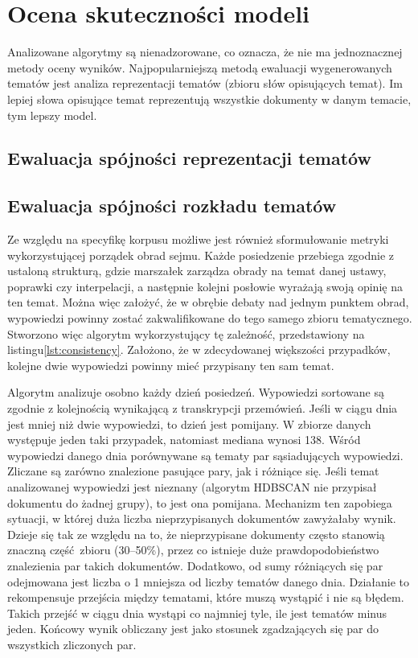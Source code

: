 
\chapter{Ocena skuteczności modeli}
	Analizowane algorytmy są nienadzorowane, co oznacza, że nie ma jednoznacznej metody oceny wyników.
	Najpopularniejszą metodą ewaluacji wygenerowanych tematów jest analiza reprezentacji tematów (zbioru słów opisujących temat).
	Im lepiej słowa opisujące temat reprezentują wszystkie dokumenty w danym temacie, tym lepszy model.

\section{Ewaluacja spójności reprezentacji tematów}


\section{Ewaluacja spójności rozkładu tematów}
	Ze względu na specyfikę korpusu możliwe jest również sformułowanie metryki wykorzystującej porządek obrad sejmu.
	Każde posiedzenie przebiega zgodnie z ustaloną strukturą, gdzie marszałek zarządza obrady na temat danej ustawy, poprawki czy interpelacji,
		a następnie kolejni posłowie wyrażają swoją opinię na ten temat.
	Można więc założyć, że w obrębie debaty nad jednym punktem obrad, wypowiedzi powinny zostać zakwalifikowane do tego samego zbioru tematycznego.
	Stworzono więc algorytm wykorzystujący tę zależność, przedstawiony na listingu\ref{lst:consistency}.
	Założono, że w zdecydowanej większości przypadków, kolejne dwie wypowiedzi powinny mieć przypisany ten sam temat.

	Algorytm analizuje osobno każdy dzień posiedzeń.
	Wypowiedzi sortowane są zgodnie z kolejnością wynikającą z transkrypcji przemówień.
	Jeśli w ciągu dnia jest mniej niż dwie wypowiedzi, to dzień jest pomijany.
	W zbiorze danych występuje jeden taki przypadek, natomiast mediana wynosi 138.
	Wśród wypowiedzi danego dnia porównywane są tematy par sąsiadujących wypowiedzi.
	Zliczane są zarówno znalezione pasujące pary, jak i różniące się.
	Jeśli temat analizowanej wypowiedzi jest nieznany (algorytm HDBSCAN nie przypisał dokumentu do żadnej grupy),
		to jest ona pomijana.
	Mechanizm ten zapobiega sytuacji, w której duża liczba nieprzypisanych dokumentów zawyżałaby wynik.
	Dzieje się tak ze względu na to, że nieprzypisane dokumenty często stanowią znaczną część zbioru (30--50\%),
		przez co istnieje duże prawdopodobieństwo znalezienia par takich dokumentów.
	Dodatkowo, od sumy różniących się par odejmowana jest liczba o 1 mniejsza od liczby tematów danego dnia.
	Działanie to rekompensuje przejścia między tematami, które muszą wystąpić i nie są błędem.
	Takich przejść w ciągu dnia wystąpi co najmniej tyle, ile jest tematów minus jeden.
	Końcowy wynik obliczany jest jako stosunek zgadzających się par do wszystkich zliczonych par.
	

